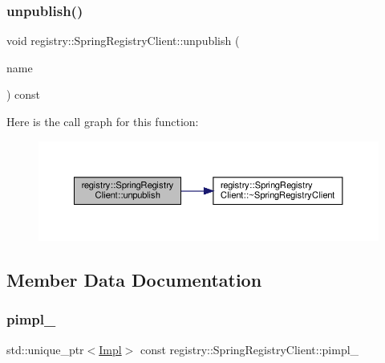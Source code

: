 \subsubsection{\texorpdfstring{unpublish()}{unpublish()}}
{\footnotesize\ttfamily void registry\+::\+Spring\+Registry\+Client\+::unpublish (\begin{DoxyParamCaption}\item[{\hyperlink{structregistry_1_1BufferLocation}{Buffer\+Location} const \&}]{name }\end{DoxyParamCaption}) const}

Here is the call graph for this function\+:\nopagebreak
\begin{figure}[H]
\begin{center}
\leavevmode
\includegraphics[width=350pt]{classregistry_1_1SpringRegistryClient_ab145f994204bb50543e24fd379ae6a21_cgraph}
\end{center}
\end{figure}


\subsection{Member Data Documentation}
\mbox{\label{classregistry_1_1SpringRegistryClient_a509b09f05c4caf239282663b41420a76}} 
\subsubsection{\texorpdfstring{pimpl\+\_\+}{pimpl\_}}
{\footnotesize\ttfamily std\+::unique\+\_\+ptr$<$\hyperlink{classregistry_1_1SpringRegistryClient_1_1Impl}{Impl}$>$ const registry\+::\+Spring\+Registry\+Client\+::pimpl\+\_\+\hspace{0.3cm}{\ttfamily [private]}}

\mbox{\label{classregistry_1_1SpringRegistryClient_a08350bc00947b986855eb6c462d03d2f}} 
